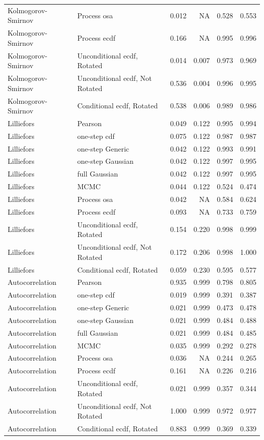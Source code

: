 \documentclass[
]{article}
\begin{document}
\begin{table}[H]
\begin{tabular}[t]{llrrrr}
Kolmogorov- Smirnov & Process osa & 0.012 & NA & 0.528 & 0.553\\
Kolmogorov- Smirnov & Process ecdf & 0.166 & NA & 0.995 & 0.996\\
Kolmogorov- Smirnov & Unconditional ecdf, Rotated & 0.014 & 0.007 & 0.973 & 0.969\\
\addlinespace
Kolmogorov- Smirnov & Unconditional ecdf, Not Rotated & 0.536 & 0.004 & 0.996 & 0.995\\
Kolmogorov- Smirnov & Conditional ecdf, Rotated & 0.538 & 0.006 & 0.989 & 0.986\\
Lilliefors & Pearson & 0.049 & 0.122 & 0.995 & 0.994\\
Lilliefors & one-step cdf & 0.075 & 0.122 & 0.987 & 0.987\\
Lilliefors & one-step Generic & 0.042 & 0.122 & 0.993 & 0.991\\
\addlinespace
Lilliefors & one-step Gaussian & 0.042 & 0.122 & 0.997 & 0.995\\
Lilliefors & full Gaussian & 0.042 & 0.122 & 0.997 & 0.995\\
Lilliefors & MCMC & 0.044 & 0.122 & 0.524 & 0.474\\
Lilliefors & Process osa & 0.042 & NA & 0.584 & 0.624\\
Lilliefors & Process ecdf & 0.093 & NA & 0.733 & 0.759\\
\addlinespace
Lilliefors & Unconditional ecdf, Rotated & 0.154 & 0.220 & 0.998 & 0.999\\
Lilliefors & Unconditional ecdf, Not Rotated & 0.172 & 0.206 & 0.998 & 1.000\\
Lilliefors & Conditional ecdf, Rotated & 0.059 & 0.230 & 0.595 & 0.577\\
Autocorrelation & Pearson & 0.935 & 0.999 & 0.798 & 0.805\\
Autocorrelation & one-step cdf & 0.019 & 0.999 & 0.391 & 0.387\\
\addlinespace
Autocorrelation & one-step Generic & 0.021 & 0.999 & 0.473 & 0.478\\
Autocorrelation & one-step Gaussian & 0.021 & 0.999 & 0.484 & 0.488\\
Autocorrelation & full Gaussian & 0.021 & 0.999 & 0.484 & 0.485\\
Autocorrelation & MCMC & 0.035 & 0.999 & 0.292 & 0.278\\
Autocorrelation & Process osa & 0.036 & NA & 0.244 & 0.265\\
\addlinespace
Autocorrelation & Process ecdf & 0.161 & NA & 0.226 & 0.216\\
Autocorrelation & Unconditional ecdf, Rotated & 0.021 & 0.999 & 0.357 & 0.344\\
Autocorrelation & Unconditional ecdf, Not Rotated & 1.000 & 0.999 & 0.972 & 0.977\\
Autocorrelation & Conditional ecdf, Rotated & 0.883 & 0.999 & 0.369 & 0.339\\
\bottomrule
\end{tabular}
\end{table}
\end{document}
